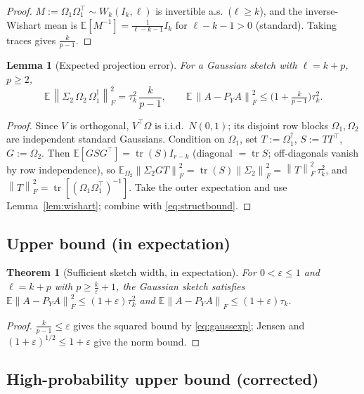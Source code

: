 \documentclass{amsart}
\newtheorem{theorem}{Theorem}
\newtheorem{lemma}{Lemma}
\theoremstyle{definition}
\DeclareMathOperator{\tr}{tr}
\newcommand{\Frob}[1]{\left\lVert #1\right\rVert_F}
\newcommand{\E}{\mathbb{E}}
\begin{document}
\begin{proof}
$M:=\Omega_1\Omega_1^\top\sim W_k(I_k,\ell)$ is invertible a.s.\ ($\ell\ge k$),
and the inverse-Wishart mean is $\E[M^{-1}]=\frac{1}{\ell-k-1}I_k$ for
$\ell-k-1>0$ (standard). Taking traces gives $\frac{k}{p-1}$.
\end{proof}

\begin{lemma}[Expected projection error]\label{lem:gauss}
For a Gaussian sketch with $\ell=k+p$, $p\ge2$,
\begin{equation}\label{eq:gaussexp}
\E\,\Frob{\Sigma_2\,\Omega_2\,\Omega_1^{\dagger}}^2=\tau_k^2\,\frac{k}{p-1},
\qquad
\E\,\Frob{A-P_Y A}^2\le\Big(1+\tfrac{k}{p-1}\Big)\tau_k^2 .
\end{equation}
\end{lemma}

\begin{proof}
Since $V$ is orthogonal, $V^\top\Omega$ is i.i.d.\ $N(0,1)$; its disjoint row
blocks $\Omega_1,\Omega_2$ are independent standard Gaussians. Condition on
$\Omega_1$, set $T:=\Omega_1^{\dagger}$, $S:=TT^\top$, $G:=\Omega_2$. Then
$\E[GSG^\top]=\tr(S)I_{r-k}$ (diagonal $=\tr S$; off-diagonals vanish by
row independence), so
$\E_{\Omega_2}\Frob{\Sigma_2 GT}^2=\tr(S)\Frob{\Sigma_2}^2
=\Frob{T}^2\,\tau_k^2$, and $\Frob{T}^2=\tr[(\Omega_1\Omega_1^\top)^{-1}]$.
Take the outer expectation and use Lemma~\ref{lem:wishart}; combine with
\eqref{eq:structbound}.
\end{proof}

\subsection{Upper bound (in expectation)}

\begin{theorem}[Sufficient sketch width, in expectation]\label{thm:upper}
For $0<\varepsilon\le1$ and $\ell=k+p$ with $p\ge\frac{k}{\varepsilon}+1$, the
Gaussian sketch satisfies
$\E\Frob{A-P_YA}^2\le(1+\varepsilon)\tau_k^2$ and
$\E\Frob{A-P_YA}\le(1+\varepsilon)\tau_k$.
\end{theorem}

\begin{proof}
$\frac{k}{p-1}\le\varepsilon$ gives the squared bound by \eqref{eq:gaussexp};
Jensen and $(1+\varepsilon)^{1/2}\le1+\varepsilon$ give the norm bound.
\end{proof}

\subsection{High-probability upper bound (corrected)}\label{sec:hp}
\end{document}
